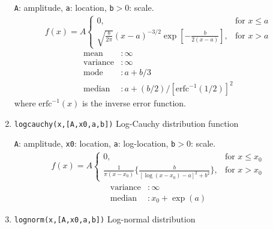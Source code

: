 \documentclass[reprint,showpacs,prb,nofootinbib,amsmath,amssymb]{revtex4-1}
\begin{document}
\begin{enumerate}
\verb|A|: amplitude, \verb|a|: location, \verb|b|$>0$: scale.
\begin{eqnarray}
f(x)=A
\begin{cases}
0, &\text{for }x\leq a \\
\sqrt{\frac{b}{2\pi}}\left(x-a\right)^{-3/2}\exp\left[-\frac{b}{2(x-a)}\right], &\text{for }x>a  \nonumber
\end{cases}
\end{eqnarray}
\begin{align}
	\mbox{mean} 		&: \mbox{$\infty$} \nonumber \\
	\mbox{variance}		&: \mbox{$\infty$} \nonumber \\
	\mbox{mode}         &: \mbox{$a+b/3$}  \nonumber \\
	\mbox{median}       &: \mbox{$a+(b/2)/\left[\mathrm{erfc}^{-1}(1/2)\right]^2$}  \nonumber	
\end{align}
where $\mathrm{erfc}^{-1}(x)$ is the inverse error function.

\item \verb|logcauchy(x,[A,x0,a,b])| Log-Cauchy distribution function~\cite{logcauchy}

\verb|A|: amplitude, \verb|x0|: location, \verb|a|: log-location, \verb|b|$>0$: scale.
\begin{eqnarray}
f(x)=A
\begin{cases}
0, &\text{for }x\leq x_0 \\
\frac{1}{\pi(x-x_0)}\{\frac{b}{\left[\log(x-x_0)-a\right]^2+b^2}\}, &\text{for }x>x_0  \nonumber
\end{cases}
\end{eqnarray}
\begin{align}
	\mbox{variance}		&: \mbox{$\infty$} \nonumber \\
	\mbox{median}       &: \mbox{$x_0+\exp(a)$}  \nonumber	
\end{align}

\item \verb|lognorm(x,[A,x0,a,b])| Log-normal distribution~\cite{McLaughlin,lognorm}


\end{enumerate}
\end{document}
